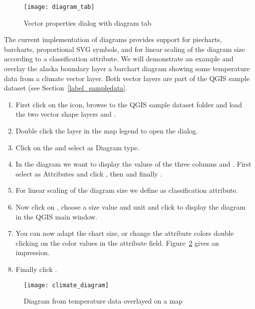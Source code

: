 \begin{figure}[ht]
   \centering
   \caption{Vector properties dialog with diagram tab \nixcaption}\label{fig:diagramtab}
   \texttt{[image: diagram\_tab]}
\end{figure}

The current implementation of diagrams provides support for piecharts, barcharts, 
proportional SVG symbols, and for linear scaling of the diagram size according 
to a classification attribute. We will demonstrate an example and overlay the 
alaska boundary layer a barchart diagram showing some temperature data from 
a climate vector layer. Both vector layers are part of the QGIS sample dataset (see
Section~\ref{label_sampledata}.

\begin{enumerate}
\item First click on the  icon,
browse to the QGIS sample dataset folder and load the two vector shape layers
 and .
\item Double click the  layer in the map legend to open the
 dialog.
\item Click on the  and select  as
Diagram type.
\item In the diagram we want to display the values of the three columns
 and . First select
 as Attributes and click , then
 and finally .  
\item For linear scaling of the diagram size we define 
as classification attribute.
\item Now click on , choose a size value and unit
and click  to display the diagram in the QGIS main window.
\item You can now adapt the chart size, or change the attribute colors double
clicking on the color values in the attribute field.
Figure~\ref{fig:climatediagram} gives an impression.
\item Finally click . 
\end{enumerate}

\begin{figure}[ht]
   \centering
   \caption{Diagram from temperature data overlayed on a map \nixcaption}\label{fig:climatediagram}
   \texttt{[image: climate\_diagram]}
\end{figure}

